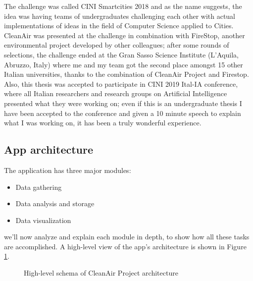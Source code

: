 \documentclass[11pt,a4paper,titlepage]{book}
\begin{document}
The challenge was called CINI Smartcities 2018 and as the name suggests, the idea was having teams of undergraduates challenging each other with actual implementations of ideas in the field of Computer Science applied to Cities.
\newline
CleanAir was presented at the challenge in combination with FireStop, another environmental project developed by other colleagues; after some rounds of selections, the challenge ended at the Gran Sasso Science Institute (L'Aquila, Abruzzo, Italy) where me and my team got the second place amongst 15 other Italian universities, thanks to the combination of CleanAir Project and Firestop.
\newline
\newline
Also, this thesis was accepted to participate in CINI 2019 Ital-IA \cite{Ital-IA} conference, where all Italian researchers and research groups on Artificial Intelligence presented what they were working on; even if this is an undergraduate thesis I have been accepted to the conference and given a 10 minute speech to explain what I was working on, it has been a truly wonderful experience.
\subsection{App architecture}
\label{cleanair:apparch}
The application has three major modules:
\begin{itemize}
    \item Data gathering
    \item Data analysis and storage
    \item Data visualization
\end{itemize}
we'll now analyze and explain each module in depth, to show how all these tasks are accomplished. A high-level view of the app's architecture is shown in Figure \ref{cleanair_schema}. 
\begin{figure}[ht]
    \centering
    
    \caption{High-level schema of CleanAir Project architecture}
    \label{cleanair_schema}
\end{figure}
\end{document}

